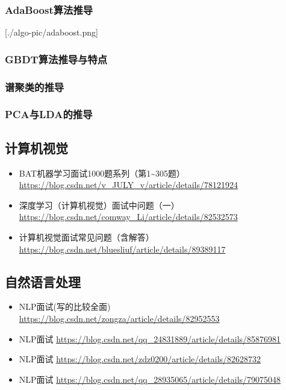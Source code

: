 \documentclass[11pt]{article}
\begin{document}
\subsubsection{AdaBoost算法推导}
\label{sec-6-3-10}

[./algo-pic/adaboost.png]

\subsubsection{GBDT算法推导与特点}
\label{sec-6-3-11}

\subsubsection{谱聚类的推导}
\label{sec-6-3-12}

\subsubsection{PCA与LDA的推导}
\label{sec-6-3-13}

\subsection{计算机视觉}
\label{sec-6-4}
\begin{itemize}
\item BAT机器学习面试1000题系列（第1\textasciitilde{}305题）\url{https://blog.csdn.net/v_JULY_v/article/details/78121924}
\item 深度学习（计算机视觉）面试中问题（一） \url{https://blog.csdn.net/comway_Li/article/details/82532573}
\item 计算机视觉面试常见问题（含解答）\url{https://blog.csdn.net/bluesliuf/article/details/89389117}
\end{itemize}

\subsection{自然语言处理}
\label{sec-6-5}
\begin{itemize}
\item NLP面试(写的比较全面) \url{https://blog.csdn.net/zongza/article/details/82952553}
\item NLP面试 \url{https://blog.csdn.net/qq_24831889/article/details/85876981}
\item NLP面试 \url{https://blog.csdn.net/zdz0200/article/details/82628732}
\item NLP面试 \url{https://blog.csdn.net/qq_28935065/article/details/79075048}
\end{itemize}
\end{document}
